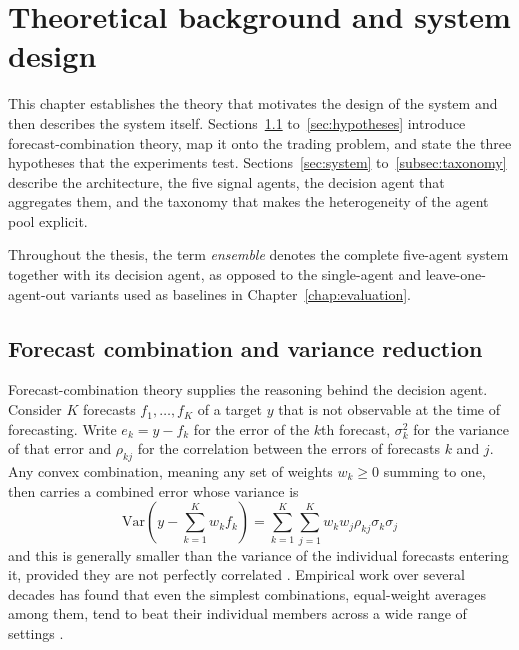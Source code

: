 \chapter{Theoretical background and system design}\label{sec:theory}

This chapter establishes the theory that motivates the design of the system and then describes the system itself. Sections~\ref{sec:forecast_combination} to~\ref{sec:hypotheses} introduce forecast-combination theory, map it onto the trading problem, and state the three hypotheses that the experiments test. Sections~\ref{sec:system} to~\ref{subsec:taxonomy} describe the architecture, the five signal agents, the decision agent that aggregates them, and the taxonomy that makes the heterogeneity of the agent pool explicit.

Throughout the thesis, the term \emph{ensemble} denotes the complete five-agent system together with its decision agent, as opposed to the single-agent and leave-one-agent-out variants used as baselines in Chapter~\ref{chap:evaluation}.

\section{Forecast combination and variance reduction}\label{sec:forecast_combination}

Forecast-combination theory supplies the reasoning behind the decision agent. Consider $K$ forecasts $f_1, \ldots, f_K$ of a target $y$ that is not observable at the time of forecasting. Write $e_k = y - f_k$ for the error of the $k$th forecast, $\sigma_k^2$ for the variance of that error and $\rho_{kj}$ for the correlation between the errors of forecasts $k$ and $j$. Any convex combination, meaning any set of weights $w_k \geq 0$ summing to one, then carries a combined error whose variance is
\begin{equation}
\mathrm{Var}\!\left( y - \sum_{k=1}^{K} w_k f_k \right)
= \sum_{k=1}^{K} \sum_{j=1}^{K} w_k w_j \rho_{kj} \sigma_k \sigma_j
\label{eq:combined_variance}
\end{equation}
and this is generally smaller than the variance of the individual forecasts entering it, provided they are not perfectly correlated \cite{batesgranger1969,clemen1989,timmermann2006}. Empirical work over several decades has found that even the simplest combinations, equal-weight averages among them, tend to beat their individual members across a wide range of settings \cite{clemen1989,timmermann2006}.

